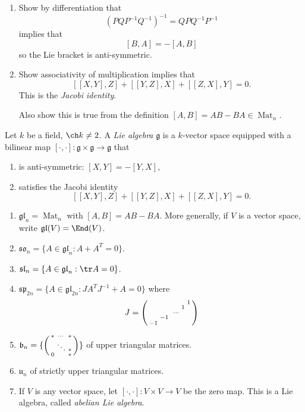 \documentclass[a4paper]{article}
\DeclareMathOperator{\Mat}{Mat}
\newcommand*{\Lie}[1]{\mathfrak{#1}} %
\begin{document}
\begin{ex}\leavevmode
  \begin{enumerate}
  \item Show by differentiation that
    \[
      (PQP^{-1}Q^{-1})^{-1} = QPQ^{-1}P^{-1}
    \]
    implies that
    \[
      [B, A] = -[A, B]
    \]
    so the Lie bracket is anti-symmetric.
  \item Show associativity of multiplication implies that
    \[
      [[X, Y], Z] + [[Y, Z], X] + [[Z, X], Y] = 0.
    \]
    This is the \emph{Jacobi identity}.

    Also show this is true from the definition \([A, B] = AB - BA \in \Mat_n\).
  \end{enumerate}
\end{ex}

\begin{definition}
  Let \(k\) be a field, \(\ch k \neq 2\). A \emph{Lie algebra} \(\Lie g\) is a \(k\)-vector space equipped with a bilinear map \([\cdot, \cdot]: \Lie g \times \Lie g \to \Lie g\) that
  \begin{enumerate}
  \item is anti-symmetric: \([X, Y] = - [Y, X]\),
  \item satisfies the Jacobi identity
    \[
      [[X, Y], Z] + [[Y, Z], X] + [[Z, X], Y] = 0.
    \]
  \end{enumerate}
\end{definition}

\begin{eg}\leavevmode
  \begin{enumerate}
  \item \(\Lie{gl}_n = \Mat_n\) with \([A, B] = AB - BA\). More generally, if \(V\) is a vector space, write \(\Lie{gl}(V) = \End(V)\).
  \item \(\Lie{so}_n = \{A \in \Lie{gl}_n: A + A^T = 0\}\).
  \item \(\Lie{sl}_n = \{A \in \Lie{gl}_n: \tr A = 0\}\).
  \item \(\Lie{sp}_{2n} = \{A \in \Lie{gl}_{2n}: JA^TJ^{-1} + A = 0\}\) where
    \[
      J =
      \begin{psmallmatrix}
        & & & & & 1 \\
        & & & & 1 \\
        & & & \cdots \\
        & -1 \\
        -1
      \end{psmallmatrix}
    \]
  \item \(\Lie{b}_n = \{
    \begin{psmallmatrix}
      * & \cdots & * \\
      & \ddots & * \\
      0 & & *
    \end{psmallmatrix}
    \}
    \) of upper triangular matrices.
  \item \(\Lie u_n\) of strictly upper triangular matrices.
  \item If \(V\) is any vector space, let \([\cdot, \cdot]: V \times V \to V\) be the zero map. This is a Lie algebra, called \emph{abelian Lie algebra}.
  \end{enumerate}
\end{eg}
\end{document}
